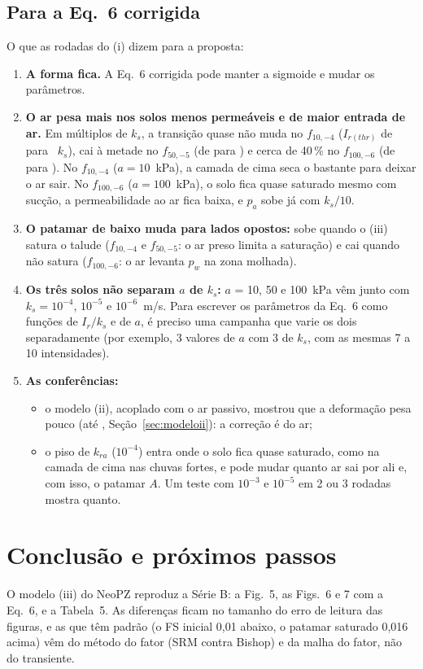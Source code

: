 \documentclass[11pt,a4paper]{article}
\begin{document}
\subsection{Para a Eq.~6 corrigida}\label{sec:eq6ar}
O que as \iFeitos{} rodadas do (i) dizem para a proposta:
\begin{enumerate}
  \item \textbf{A forma fica.} A Eq.~6 corrigida pode manter a sigmoide e mudar os parâmetros.
  \item \textbf{O ar pesa mais nos solos menos permeáveis e de maior entrada de ar.} Em múltiplos de $k_s$, a transição
    quase não muda no $f_{10,-4}$ ($I_{r(thr)}$ de \ThrksTresDez{} para \ThrksUmDez~$k_s$), cai à metade no $f_{50,-5}$
    (de \ThrksTresCinq{} para \ThrksUmCinq) e cerca de 40\,\% no $f_{100,-6}$ (de \ThrksTresCem{} para \ThrksUmCem). No $f_{10,-4}$ ($a = 10$~kPa), a camada de cima seca o bastante para deixar o
    ar sair. No $f_{100,-6}$ ($a = 100$~kPa), o solo fica quase saturado mesmo com sucção, a permeabilidade ao ar fica
    baixa, e $p_a$ sobe já com $k_s/10$.
  \item \textbf{O patamar de baixo muda para lados opostos:} sobe quando o (iii) satura o talude ($f_{10,-4}$ e
    $f_{50,-5}$: o ar preso limita a saturação) e cai quando não satura ($f_{100,-6}$: o ar levanta $p_w$ na zona
    molhada).
  \item \textbf{Os três solos não separam $a$ de $k_s$:} $a$ = 10, 50 e 100~kPa vêm junto com $k_s = 10^{-4}$, $10^{-5}$
    e $10^{-6}$~m/s. Para escrever os parâmetros da Eq.~6 como funções de $I_r/k_s$ e de $a$, é preciso uma campanha que
    varie os dois separadamente (por exemplo, 3 valores de $a$ com 3 de $k_s$, com as mesmas 7 a 10 intensidades).
  \item \textbf{As conferências:}
    \begin{itemize}
      \item o modelo (ii), acoplado com o ar passivo, mostrou que a deformação pesa pouco (até ,
        Seção~\ref{sec:modeloii}): a correção é do ar;
      \item o piso de $k_{ra}$ ($10^{-4}$) entra onde o solo fica quase saturado, como na camada de cima nas chuvas
        fortes, e pode mudar quanto ar sai por ali e, com isso, o patamar $A$. Um teste com $10^{-3}$ e $10^{-5}$ em 2 ou
        3 rodadas mostra quanto.
    \end{itemize}
\end{enumerate}

\section{Conclusão e próximos passos}
O modelo (iii) do NeoPZ reproduz a Série B: a Fig.~5, as Figs.~6 e 7 com a Eq.~6, e a Tabela~5. As diferenças ficam
no tamanho do erro de leitura das figuras, e as que têm padrão (o FS inicial 0,01 abaixo, o patamar saturado 0,016
acima) vêm do método do fator (SRM contra Bishop) e da malha do fator, não do transiente.
\end{document}
